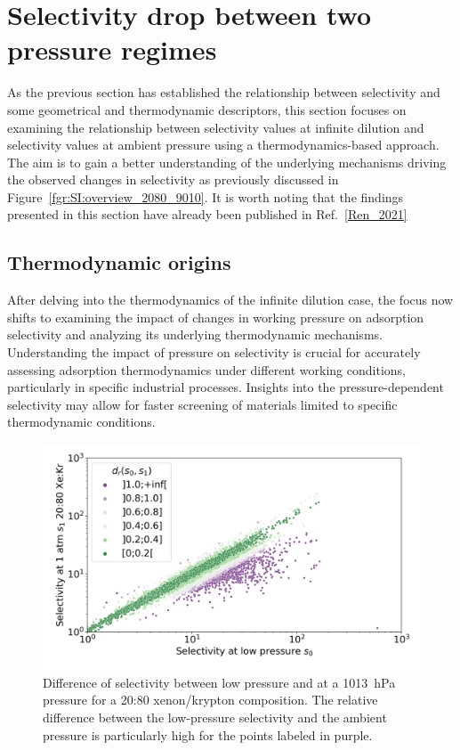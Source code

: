\documentclass[main.tex]{subfiles}
\begin{document}
\section{Selectivity drop between two pressure regimes}

As the previous section has established the relationship between selectivity and some geometrical and thermodynamic descriptors, this section focuses on examining the relationship between selectivity values at infinite dilution and selectivity values at ambient pressure using a thermodynamics-based approach. The aim is to gain a better understanding of the underlying mechanisms driving the observed changes in selectivity as previously discussed in Figure~\ref{fgr:SI:overview_2080_9010}. It is worth noting that the findings presented in this section have already been published in Ref.~\ref{Ren_2021}

\subsection{Thermodynamic origins}\label{section:pressure}

After delving into the thermodynamics of the infinite dilution case, the focus now shifts to examining the impact of changes in working pressure on adsorption selectivity and analyzing its underlying thermodynamic mechanisms. Understanding the impact of pressure on selectivity is crucial for accurately assessing adsorption thermodynamics under different working conditions, particularly in specific industrial processes. Insights into the pressure-dependent selectivity may allow for faster screening of materials limited to specific thermodynamic conditions.

\begin{figure}[ht]
  \centering
    \includegraphics[width=0.6\linewidth]{figures/2-thermo/s_0_vs_s_2080_overview_log.jpg}
    \caption{Difference of selectivity between low pressure and at a \SI{1013}{\hecto\pascal} pressure for a 20:80 xenon/krypton composition. The relative difference between the low-pressure selectivity and the ambient pressure is particularly high for the points labeled in purple.}\label{fgr:overview}
\end{figure}
\end{document}
